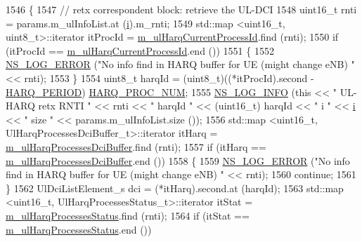\begin{DoxyCode}
1546             \{
1547               \textcolor{comment}{// retx correspondent block: retrieve the UL-DCI}
1548               uint16\_t rnti = params.m\_ulInfoList.at (\hyperlink{bernuolliDistribution_8m_a6f6ccfcf58b31cb6412107d9d5281426}{i}).m\_rnti;
1549               std::map <uint16\_t, uint8\_t>::iterator itProcId = 
      \hyperlink{classns3_1_1TdTbfqFfMacScheduler_a418d37c6f77b19886fe25e71c103e8b1}{m\_ulHarqCurrentProcessId}.find (rnti);
1550               \textcolor{keywordflow}{if} (itProcId == \hyperlink{classns3_1_1TdTbfqFfMacScheduler_a418d37c6f77b19886fe25e71c103e8b1}{m\_ulHarqCurrentProcessId}.end ())
1551                 \{
1552                   \hyperlink{group__logging_ga0261a8db1d4ac5f79417d117634fd455}{NS\_LOG\_ERROR} (\textcolor{stringliteral}{"No info find in HARQ buffer for UE (might change eNB) "} << 
      rnti);
1553                 \}
1554               uint8\_t harqId = (uint8\_t)((*itProcId).second - \hyperlink{lte-common_8h_a275321ee206f130c3ddc81fcdaa13cfd}{HARQ\_PERIOD}) %
      \hyperlink{cqa-ff-mac-scheduler_8h_a9185d8d7d2b2979181d4a7044a3d3555}{HARQ\_PROC\_NUM};
1555               \hyperlink{group__logging_gafbd73ee2cf9f26b319f49086d8e860fb}{NS\_LOG\_INFO} (\textcolor{keyword}{this} << \textcolor{stringliteral}{" UL-HARQ retx RNTI "} << rnti << \textcolor{stringliteral}{" harqId "} << (uint16\_t)
      harqId << \textcolor{stringliteral}{" i "} << \hyperlink{bernuolliDistribution_8m_a6f6ccfcf58b31cb6412107d9d5281426}{i} << \textcolor{stringliteral}{" size "}  << params.m\_ulInfoList.size ());
1556               std::map <uint16\_t, UlHarqProcessesDciBuffer\_t>::iterator itHarq = 
      \hyperlink{classns3_1_1TdTbfqFfMacScheduler_aa7b74d7f5898ae380db92cdd1205efae}{m\_ulHarqProcessesDciBuffer}.find (rnti);
1557               \textcolor{keywordflow}{if} (itHarq == \hyperlink{classns3_1_1TdTbfqFfMacScheduler_aa7b74d7f5898ae380db92cdd1205efae}{m\_ulHarqProcessesDciBuffer}.end ())
1558                 \{
1559                   \hyperlink{group__logging_ga0261a8db1d4ac5f79417d117634fd455}{NS\_LOG\_ERROR} (\textcolor{stringliteral}{"No info find in HARQ buffer for UE (might change eNB) "} << 
      rnti);
1560                   \textcolor{keywordflow}{continue};
1561                 \}
1562               UlDciListElement\_s dci = (*itHarq).second.at (harqId);
1563               std::map <uint16\_t, UlHarqProcessesStatus\_t>::iterator itStat = 
      \hyperlink{classns3_1_1TdTbfqFfMacScheduler_a845d3e79ce5c38b47c8ac8a7e4cc5b37}{m\_ulHarqProcessesStatus}.find (rnti);
1564               \textcolor{keywordflow}{if} (itStat == \hyperlink{classns3_1_1TdTbfqFfMacScheduler_a845d3e79ce5c38b47c8ac8a7e4cc5b37}{m\_ulHarqProcessesStatus}.end ())

\end{DoxyCode}

